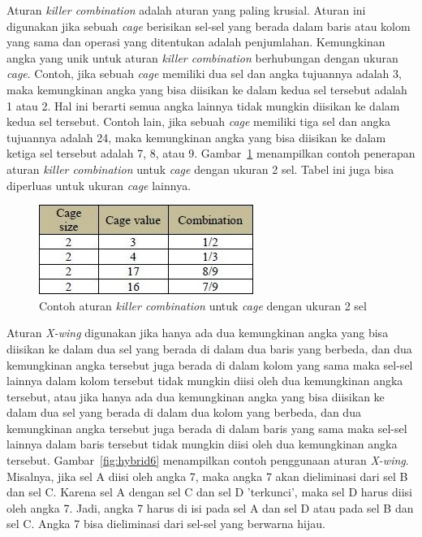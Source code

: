 Aturan \textit{killer combination} adalah aturan yang paling krusial. Aturan ini digunakan jika sebuah \textit{cage} berisikan sel-sel yang berada dalam baris atau kolom yang sama dan operasi yang ditentukan adalah penjumlahan. Kemungkinan angka yang unik untuk aturan \textit{killer combination} berhubungan dengan ukuran \textit{cage}. Contoh, jika sebuah \textit{cage} memiliki dua sel dan angka tujuannya adalah 3, maka kemungkinan angka yang bisa diisikan ke dalam kedua sel tersebut adalah 1 atau 2. Hal ini berarti semua angka lainnya tidak mungkin diisikan ke dalam kedua sel tersebut. Contoh lain, jika sebuah \textit{cage} memiliki tiga sel dan angka tujuannya adalah 24, maka kemungkinan angka yang bisa diisikan ke dalam ketiga sel tersebut adalah 7, 8, atau 9. Gambar~\ref{fig:hybrid5} menampilkan contoh penerapan aturan \textit{killer combination} untuk \textit{cage} dengan ukuran 2 sel. Tabel ini juga bisa diperluas untuk ukuran \textit{cage} lainnya.

\begin{figure}
\centering
\captionsetup{justification=centering}
\includegraphics[scale=1]{Gambar/HybridGenetic5}
\caption[Contoh aturan  \textit{killer combination} untuk \textit{cage} dengan ukuran 2 sel  ~\cite{johanna:12:hybrid}]{Contoh aturan  \textit{killer combination} untuk \textit{cage} dengan ukuran 2 sel ~\cite{johanna:12:hybrid}}
\label{fig:hybrid5}
\end{figure}

Aturan \textit{X-wing} digunakan jika hanya ada dua kemungkinan angka yang bisa diisikan ke dalam dua sel yang berada di dalam dua baris yang berbeda, dan dua kemungkinan angka tersebut juga berada di dalam kolom yang sama maka sel-sel lainnya dalam kolom tersebut tidak mungkin diisi oleh dua kemungkinan angka tersebut, atau jika hanya ada dua kemungkinan angka yang bisa diisikan ke dalam dua sel yang berada di dalam dua kolom yang berbeda, dan dua kemungkinan angka tersebut juga berada di dalam baris yang sama maka sel-sel lainnya dalam baris tersebut tidak mungkin diisi oleh dua kemungkinan angka tersebut. Gambar~\ref{fig:hybrid6} menampilkan contoh penggunaan aturan \textit{X-wing}. Misalnya, jika sel A diisi oleh angka 7, maka angka 7 akan dieliminasi dari sel B dan sel C. Karena sel A dengan sel C dan sel D 'terkunci', maka sel D harus diisi oleh angka 7. Jadi, angka 7 harus di isi pada sel A dan sel D atau pada sel B dan sel C. Angka 7 bisa dieliminasi dari sel-sel yang berwarna hijau.

